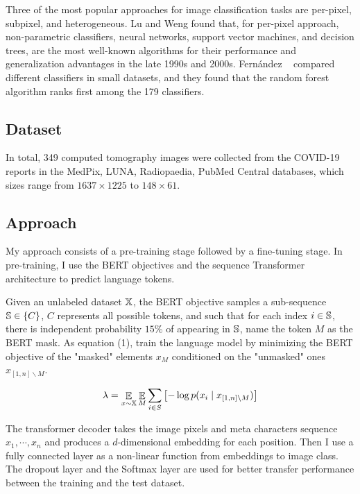 \documentclass[review]{cvpr}
\begin{document}
Three of the most popular approaches for image classification tasks are per-pixel, subpixel, and heterogeneous.
Lu and Weng found that, for per-pixel approach, non-parametric classifiers, \eg neural networks, support vector machines, and decision trees,
are the most well-known algorithms for their performance and generalization advantages in the late 1990s and 2000s.
Fern{\'a}ndez \etal~\cite{fernandez2014we} compared different classifiers in small datasets, and they found that the random forest algorithm ranks first among the 179 classifiers.

\subsection{Dataset}

In total, 349 computed tomography images were collected from the COVID-19 reports in the MedPix, LUNA, Radiopaedia, PubMed Central databases, which sizes range from $1637\times1225$ to $148\times61$.


\subsection{Approach}

My approach consists of a pre-training stage followed by a fine-tuning stage.
In pre-training, I use the BERT objectives and the sequence Transformer architecture to predict language tokens.

\par Given an unlabeled dataset $\Bbb X$, the BERT objective samples a sub-sequence $\Bbb S \in \{C\}$,
$C$ represents all possible tokens, and such that for each index $i \in \Bbb S$,
there is independent probability $15\%$ of appearing in $\Bbb S$,
name the token $M$ as the BERT mask.
As equation (1), train the language model by minimizing the BERT objective of the "masked" elements $x_M$
conditioned on the "unmasked" ones $x_{\left[1,n\right]\backslash M}$.

\begin{equation}
  \lambda = \mathop{\Bbb E}\limits_{x\sim\Bbb X} \mathop{\Bbb E}\limits_{M} \sum_{i\in S}{\bigl[-\log{p(x_i\mid x_{\left[1,n \right]\backslash M})\bigr]}}
\end{equation}

\par The transformer decoder takes the image pixels and meta characters sequence $x_1,\cdots,x_n$ and produces a $d$-dimensional
embedding for each position.
Then I use a fully connected layer as a non-linear function from embeddings to image class.
The dropout layer and the Softmax layer are used for better transfer performance between the training and the test dataset.
\end{document}
